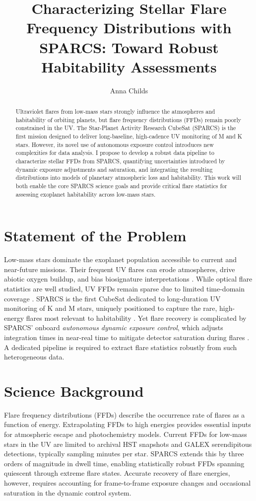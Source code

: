 \documentclass[final,letterpaper,oneside,12pt]{article}
\title{Characterizing Stellar Flare Frequency Distributions with SPARCS: Toward Robust Habitability Assessments}
\author{Anna Childs}
\begin{document}
\maketitle

\begin{abstract}
Ultraviolet flares from low-mass stars strongly influence the atmospheres and habitability of orbiting planets, but flare frequency distributions (FFDs) remain poorly constrained in the UV. The Star-Planet Activity Research CubeSat (SPARCS) is the first mission designed to deliver long-baseline, high-cadence UV monitoring of M and K stars. However, its novel use of autonomous exposure control introduces new complexities for data analysis. I propose to develop a robust data pipeline to characterize stellar FFDs from SPARCS, quantifying uncertainties introduced by dynamic exposure adjustments and saturation, and integrating the resulting distributions into models of planetary atmospheric loss and habitability. This work will both enable the core SPARCS science goals and provide critical flare statistics for assessing exoplanet habitability across low-mass stars.
\end{abstract}

\section{Statement of the Problem}
Low-mass stars dominate the exoplanet population accessible to current and near-future missions. Their frequent UV flares can erode atmospheres, drive abiotic oxygen buildup, and bias biosignature interpretations \citep{Segura2010,Luger2015}. While optical flare statistics are well studied, UV FFDs remain sparse due to limited time-domain coverage \citep{Loyd2018,France2020}. SPARCS is the first CubeSat dedicated to long-duration UV monitoring of K and M stars, uniquely positioned to capture the rare, high-energy flares most relevant to habitability \citep{Shkolnik2025}. Yet flare recovery is complicated by SPARCS’ onboard \emph{autonomous dynamic exposure control}, which adjusts integration times in near-real time to mitigate detector saturation during flares \citep{Ramiaramanantsoa2021}. A dedicated pipeline is required to extract flare statistics robustly from such heterogeneous data.

\section{Science Background}
Flare frequency distributions (FFDs) describe the occurrence rate of flares as a function of energy. Extrapolating FFDs to high energies provides essential inputs for atmospheric escape and photochemistry models. Current FFDs for low-mass stars in the UV are limited to archival HST snapshots and GALEX serendipitous detections, typically sampling minutes per star. SPARCS extends this by three orders of magnitude in dwell time, enabling statistically robust FFDs spanning quiescent through extreme flare states. Accurate recovery of flare energies, however, requires accounting for frame-to-frame exposure changes and occasional saturation in the dynamic control system.
\end{document}

